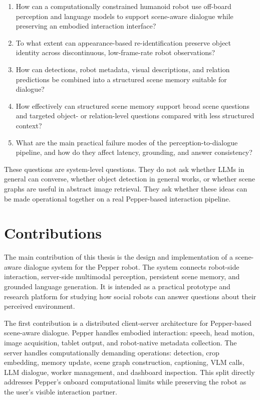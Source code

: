 \begin{enumerate}
    \item How can a computationally constrained humanoid robot use off-board perception and language models to support scene-aware dialogue while preserving an embodied interaction interface?

    \item To what extent can appearance-based re-identification preserve object identity across discontinuous, low-frame-rate robot observations?

    \item How can detections, robot metadata, visual descriptions, and relation predictions be combined into a structured scene memory suitable for dialogue?

    \item How effectively can structured scene memory support broad scene questions and targeted object- or relation-level questions compared with less structured context?

    \item What are the main practical failure modes of the perception-to-dialogue pipeline, and how do they affect latency, grounding, and answer consistency?
\end{enumerate}

These questions are system-level questions. They do not ask whether LLMs in general can converse, whether object detection in general works, or whether scene graphs are useful in abstract image retrieval. They ask whether these ideas can be made operational together on a real Pepper-based interaction pipeline.

\section{Contributions}\label{sec:intro-contributions}

The main contribution of this thesis is the design and implementation of a scene-aware dialogue system for the Pepper robot. The system connects robot-side interaction, server-side multimodal perception, persistent scene memory, and grounded language generation. It is intended as a practical prototype and research platform for studying how social robots can answer questions about their perceived environment.

The first contribution is a distributed client-server architecture for Pepper-based scene-aware dialogue. Pepper handles embodied interaction: speech, head motion, image acquisition, tablet output, and robot-native metadata collection. The server handles computationally demanding operations: detection, crop embedding, memory update, scene graph construction, captioning, VLM calls, LLM dialogue, worker management, and dashboard inspection. This split directly addresses Pepper's onboard computational limits while preserving the robot as the user's visible interaction partner.

